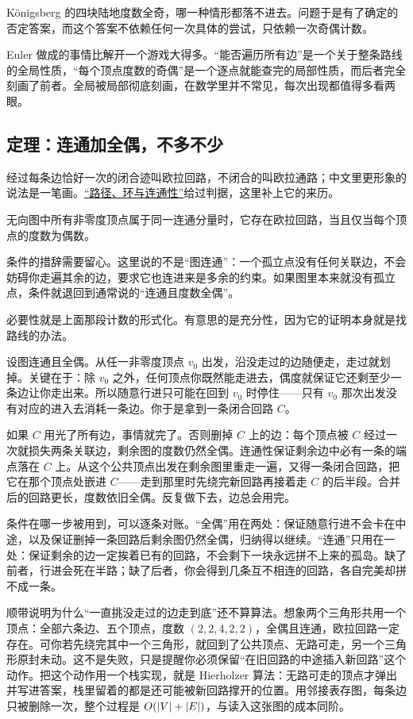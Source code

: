 Königsberg 的四块陆地度数全奇，哪一种情形都落不进去。问题于是有了确定的否定答案，而这个答案不依赖任何一次具体的尝试，只依赖一次奇偶计数。

Euler 做成的事情比解开一个游戏大得多。``能否遍历所有边''是一个关于整条路线的全局性质，``每个顶点度数的奇偶''是一个逐点就能查完的局部性质，而后者完全刻画了前者。全局被局部彻底刻画，在数学里并不常见，每次出现都值得多看两眼。

\subsection{定理：连通加全偶，不多不少}

经过每条边恰好一次的闭合迹叫欧拉回路，不闭合的叫欧拉通路；中文里更形象的说法是一笔画。\hyperref[sec:04-Discrete-Mathematics/03-Graph-Theory/02]{``路径、环与连通性''}给过判据，这里补上它的来历。

\begin{theorem}
无向图中所有非零度顶点属于同一连通分量时，它存在欧拉回路，当且仅当每个顶点的度数为偶数。
\end{theorem}

条件的措辞需要留心。这里说的不是``图连通''：一个孤立点没有任何关联边，不会妨碍你走遍其余的边，要求它也连进来是多余的约束。如果图里本来就没有孤立点，条件就退回到通常说的``连通且度数全偶''。

必要性就是上面那段计数的形式化。有意思的是充分性，因为它的证明本身就是找路线的办法。

设图连通且全偶。从任一非零度顶点 \(v_0\) 出发，沿没走过的边随便走，走过就划掉。关键在于：除 \(v_0\) 之外，任何顶点你既然能走进去，偶度就保证它还剩至少一条边让你走出来。所以随意行进只可能在回到 \(v_0\) 时停住——只有 \(v_0\) 那次出发没有对应的进入去消耗一条边。你于是拿到一条闭合回路 \(C\)。

如果 \(C\) 用光了所有边，事情就完了。否则删掉 \(C\) 上的边：每个顶点被 \(C\) 经过一次就损失两条关联边，剩余图的度数仍然全偶。连通性保证剩余边中必有一条的端点落在 \(C\) 上。从这个公共顶点出发在剩余图里重走一遍，又得一条闭合回路，把它在那个顶点处嵌进 \(C\)——走到那里时先绕完新回路再接着走 \(C\) 的后半段。合并后的回路更长，度数依旧全偶。反复做下去，边总会用完。

条件在哪一步被用到，可以逐条对账。``全偶''用在两处：保证随意行进不会卡在中途，以及保证删掉一条回路后剩余图仍然全偶，归纳得以继续。``连通''只用在一处：保证剩余的边一定挨着已有的回路，不会剩下一块永远拼不上来的孤岛。缺了前者，行进会死在半路；缺了后者，你会得到几条互不相连的回路，各自完美却拼不成一条。

顺带说明为什么``一直挑没走过的边走到底''还不算算法。想象两个三角形共用一个顶点：全部六条边、五个顶点，度数 \((2,2,4,2,2)\)，全偶且连通，欧拉回路一定存在。可你若先绕完其中一个三角形，就回到了公共顶点、无路可走，另一个三角形原封未动。这不是失败，只是提醒你必须保留``在旧回路的中途插入新回路''这个动作。把这个动作用一个栈实现，就是 Hierholzer 算法：无路可走的顶点才弹出并写进答案，栈里留着的都是还可能被新回路撑开的位置。用邻接表存图，每条边只被删除一次，整个过程是 \(O(\left|V\right|+\left|E\right|)\)，与读入这张图的成本同阶。

